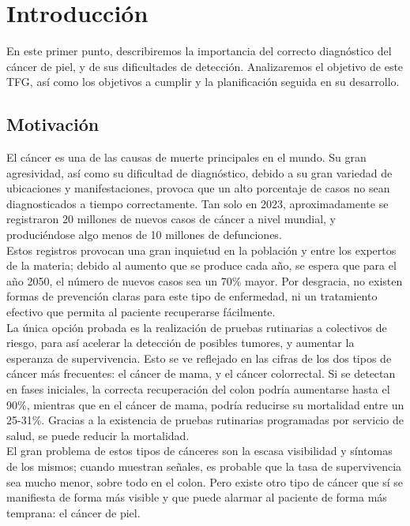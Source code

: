 \chapter{Introducción}

En este primer punto, describiremos la importancia del correcto diagnóstico del cáncer de piel, y de sus dificultades de detección. Analizaremos el objetivo de este TFG, así como los objetivos a cumplir y la planificación seguida en su desarrollo.

\section{Motivación}

El cáncer es una de las causas de muerte principales en el mundo. Su gran agresividad, así como su dificultad de diagnóstico, debido a su gran variedad de ubicaciones y manifestaciones, provoca que un alto porcentaje de casos no sean diagnosticados a tiempo correctamente. Tan solo en 2023, aproximadamente se registraron 20 millones de nuevos casos de cáncer a nivel mundial, y produciéndose algo menos de 10 millones de defunciones.\\

Estos registros provocan una gran inquietud en la población y entre los expertos de la materia; debido al aumento que se produce cada año, se espera que para el año 2050, el número de nuevos casos sea un 70\% mayor.  Por desgracia, no existen formas de prevención claras para este tipo de enfermedad, ni un tratamiento efectivo que permita al paciente recuperarse fácilmente. \\

La única opción probada es la realización de pruebas rutinarias a colectivos de riesgo, para así acelerar la detección de posibles tumores, y aumentar la esperanza de supervivencia. Esto se ve reflejado en las cifras de los dos tipos de cáncer más frecuentes: el cáncer de mama, y el cáncer colorrectal. Si se detectan en fases iniciales, la correcta recuperación del colon podría aumentarse hasta el 90\%, mientras que en el cáncer de mama, podría reducirse su mortalidad entre un 25-31\%. Gracias a la existencia de pruebas rutinarias programadas por servicio de salud, se puede reducir la mortalidad.\\

El gran problema de estos tipos de cánceres son la escasa visibilidad y síntomas de los mismos; cuando muestran señales, es probable que la tasa de supervivencia sea mucho menor, sobre todo en el colon. Pero existe otro tipo de cáncer que sí se manifiesta de forma más visible y que puede alarmar al paciente de forma más temprana: el cáncer de piel.\\

